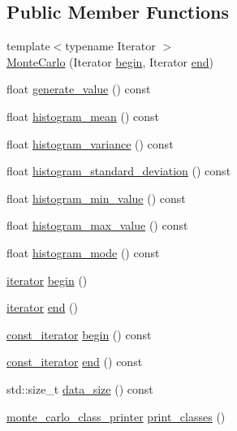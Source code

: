 \subsection*{Public Member Functions}
\begin{DoxyCompactItemize}
\item 
{\footnotesize template$<$typename Iterator $>$ }\\\hyperlink{classMonteCarlo_a1620378a238453e1203ffb45d8b9df82}{Monte\+Carlo} (Iterator \hyperlink{classMonteCarlo_ab9578a53842f7df281ad198f195f3c47}{begin}, Iterator \hyperlink{classMonteCarlo_a52b4ed803009aa163306b63796827d61}{end})
\item 
float \hyperlink{classMonteCarlo_ac66e8e496c2790a58440cfa879587be6}{generate\+\_\+value} () const
\item 
float \hyperlink{classMonteCarlo_a59eb4eacad6a3e88b2ee2cd21cb177cd}{histogram\+\_\+mean} () const
\item 
float \hyperlink{classMonteCarlo_a40ba8a0aaa4d03aa64571fe29f61049a}{histogram\+\_\+variance} () const
\item 
float \hyperlink{classMonteCarlo_ab54725f0438b5ba9eeefdf60efd23577}{histogram\+\_\+standard\+\_\+deviation} () const
\item 
float \hyperlink{classMonteCarlo_a1280523b7ca7463dcd16c23a8f8a5439}{histogram\+\_\+min\+\_\+value} () const
\item 
float \hyperlink{classMonteCarlo_a422c7392cf26796d756b347a4d97a522}{histogram\+\_\+max\+\_\+value} () const
\item 
float \hyperlink{classMonteCarlo_a88e6309c74bb2e935dba5e4b7682da5b}{histogram\+\_\+mode} () const
\item 
\hyperlink{classMonteCarlo_a8f83ff48a51d2f19e5c87b8fade7bbe3}{iterator} \hyperlink{classMonteCarlo_ab9578a53842f7df281ad198f195f3c47}{begin} ()
\item 
\hyperlink{classMonteCarlo_a8f83ff48a51d2f19e5c87b8fade7bbe3}{iterator} \hyperlink{classMonteCarlo_a52b4ed803009aa163306b63796827d61}{end} ()
\item 
\hyperlink{classMonteCarlo_a74dc0884e3b02002956de4fb84a0bb01}{const\+\_\+iterator} \hyperlink{classMonteCarlo_a9d5ce89a44acd99626bed6351091e981}{begin} () const
\item 
\hyperlink{classMonteCarlo_a74dc0884e3b02002956de4fb84a0bb01}{const\+\_\+iterator} \hyperlink{classMonteCarlo_a6e15e3a5a96163b8cc84ec9892c2e88b}{end} () const
\item 
std\+::size\+\_\+t \hyperlink{classMonteCarlo_a994af145a2a63a51c96a13d6e472b793}{data\+\_\+size} () const
\item 
\hyperlink{structMonteCarlo_1_1monte__carlo__class__printer}{monte\+\_\+carlo\+\_\+class\+\_\+printer} \hyperlink{classMonteCarlo_a736ca6442900d47116bc040c284ac69f}{print\+\_\+classes} ()
\end{DoxyCompactItemize}


